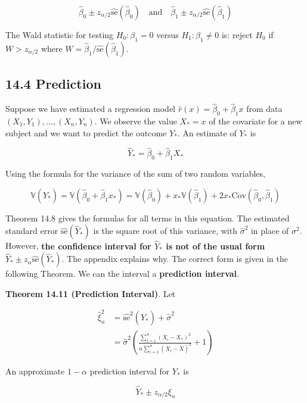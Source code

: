 \[
\hat{\beta}_{0} \pm z_{\alpha/2} \hat{\text{se}}(\hat{\beta}_{0})
\quad \text{and} \quad
\hat{\beta}_{1} \pm z_{\alpha/2} \hat{\text{se}}(\hat{\beta}_{1})
\]

The Wald statistic for testing \(H_{0} : \beta_{1} = 0\) versus
\(H_{1}: \beta_{1} \neq 0\) is: reject \(H_{0}\) if \(W > z_{\alpha / 2}\)
where \(W = \hat{\beta}_{1} / \hat{\text{se}}(\hat{\beta}_{1})\).

\subsection*{14.4 Prediction}\label{prediction}

Suppose we have estimated a regression model
\(\hat{r}(x) = \hat{\beta}_{0} + \hat{\beta}_{1} x\) from data
\((X_{1}, Y_{1}), \dots, (X_{n}, Y_{n})\). We observe the value \(X_* = x\) of
the covariate for a new subject and we want to predict the outcome
\(Y_*\). An estimate of \(Y_*\) is

\[ \hat{Y}_* = \hat{\beta}_{0} + \hat{\beta}_{1} X_*\]

Using the formula for the variance of the sum of two random variables,

\[ \mathbb{V}(\hat{Y}_*) = \mathbb{V}(\hat{\beta}_{0} + \hat{\beta}_{1} x_*) = \mathbb{V}(\hat{\beta}_{0}) + x_* \mathbb{V}(\hat{\beta}_{1}) + 2 x_* \text{Cov}(\hat{\beta}_{0}, \hat{\beta}_{1}) \]

Theorem 14.8 gives the formulas for all terms in this equation. The
estimated standard error \(\hat{\text{se}}(\hat{Y}_*)\) is the square
root of this variance, with \(\hat{\sigma}^{2}\) in place of \(\sigma^{2}\).
However, \textbf{the confidence interval for \(\hat{Y}_*\) is not of the
usual form} \(\hat{Y}_* \pm z_{\alpha} \hat{\text{se}}(\hat{Y}_*)\). The
appendix explains why. The correct form is given in the following
Theorem. We can the interval a \textbf{prediction interval}.

\textbf{Theorem 14.11 (Prediction Interval)}. Let

\begin{align*}
\hat{\xi}_{n}^{2} &= \hat{\text{se}}^{2}(\hat{Y}_*) + \hat{\sigma}^{2} \\
&= \hat{\sigma}^{2} \left(\frac{\sum_{i=1}^{n} (X_{i} - X_*)^{2}}{n \sum_{i=1}^{n} (X_{i} - \overline{X})^{2}} + 1 \right)
\end{align*}

An approximate \(1 - \alpha\) prediction interval for \(Y_*\) is

\[ \hat{Y}_* \pm z_{\alpha/2} \xi_{n}\]

